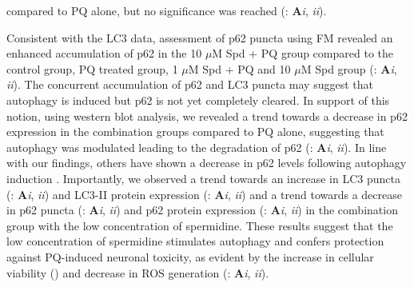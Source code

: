 compared to PQ alone, but no significance was reached  (: \textbf{A}\textit{i}, \textit{ii}). 

 Consistent with the LC3 data, assessment of p62 puncta using FM revealed an enhanced accumulation of p62 in the 10 $\mu$M Spd + PQ group compared to the control group, PQ treated group, 1 $\mu$M Spd + PQ and 10 $\mu$M Spd group (: \textbf{A}\textit{i}, \textit{ii}). The concurrent accumulation of p62 and LC3 puncta may suggest that autophagy is induced but p62 is not yet completely cleared. In support of this notion, using western blot analysis, we revealed a trend towards a decrease in p62 expression in the combination groups compared to PQ alone, suggesting that autophagy was modulated leading to the degradation of p62 (: \textbf{A}\textit{i}, \textit{ii}). In line with our findings, others have shown a decrease in p62 levels following autophagy induction \citep{Bjorkoy2005,Jones2000,Zhou2017}. Importantly, we observed a trend towards an increase in LC3 puncta (: \textbf{A}\textit{i}, \textit{ii}) and LC3-II protein expression (: \textbf{A}\textit{i}, \textit{ii}) and a trend towards a decrease in p62 puncta (: \textbf{A}\textit{i}, \textit{ii}) and p62 protein expression (: \textbf{A}\textit{i}, \textit{ii}) in the combination group with the low concentration of spermidine. These results suggest that the low concentration of spermidine stimulates autophagy and confers protection against PQ-induced neuronal toxicity, as evident by the increase in cellular viability () and decrease in ROS generation (: \textbf{A}\textit{i}, \textit{ii}). 

